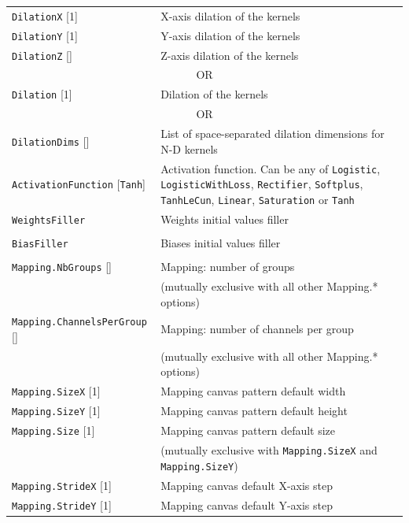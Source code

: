\documentclass[a4paper,11pt,oneside]{article}
\begin{document}
\begin{center}
\begin{longtable}{| p{5cm} | p{10cm} | }
  \hline
  \lstinline!DilationX! [1] & X-axis dilation of the kernels \\
  \lstinline!DilationY! [1] & Y-axis dilation of the kernels \\
  \lstinline!DilationZ! [] & Z-axis dilation of the kernels \\
  \multicolumn{2}{|c|}{\cellcolor{clrgray}\tiny OR} \\
  \lstinline!Dilation! [1] & Dilation of the kernels \\
  \multicolumn{2}{|c|}{\cellcolor{clrgray}\tiny OR} \\
  \lstinline!DilationDims! [] & List of space-separated dilation dimensions for N-D kernels \\
  \hline
  \lstinline!ActivationFunction! [\lstinline!Tanh!] & Activation function.
  Can be any of \lstinline!Logistic!,  \lstinline!LogisticWithLoss!,
  \lstinline!Rectifier!, \lstinline!Softplus!, \lstinline!TanhLeCun!,
  \lstinline!Linear!, \lstinline!Saturation! or \lstinline!Tanh! \\
  \lstinline!WeightsFiller! & Weights initial values filler \\
   & \\
  \lstinline!BiasFiller! & Biases initial values filler \\
   & \\
  \lstinline!Mapping.NbGroups! [] & Mapping: number of groups \\
   & (mutually exclusive with all other Mapping.* options) \\
  \lstinline!Mapping.ChannelsPerGroup! [] & Mapping: number of channels per group \\
   & (mutually exclusive with all other Mapping.* options) \\
  \lstinline!Mapping.SizeX! [1] & Mapping canvas pattern default width \\
  \lstinline!Mapping.SizeY! [1] & Mapping canvas pattern default height \\
  \lstinline!Mapping.Size! [1] & Mapping canvas pattern default size \\
   & (mutually exclusive with \lstinline!Mapping.SizeX!
   and \lstinline!Mapping.SizeY!) \\
  \lstinline!Mapping.StrideX! [1] & Mapping canvas default X-axis step \\
  \lstinline!Mapping.StrideY! [1] & Mapping canvas default Y-axis step \\

\end{longtable}
\end{center}
\end{document}
